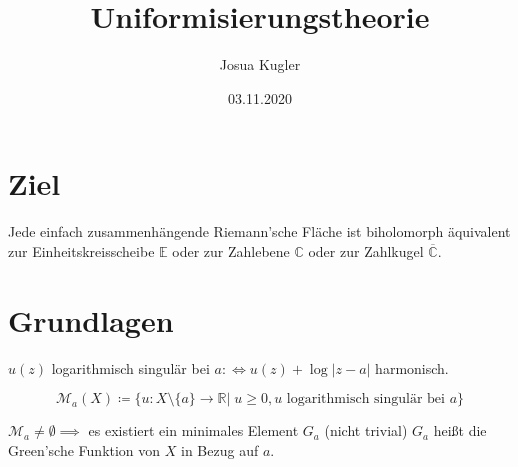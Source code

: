 \documentclass{beamer}
\title{Uniformisierungstheorie}
\author{Josua Kugler}
\date{03.11.2020}
\newcommand{\R}{\mathbb{R}}
\newcommand{\C}{\mathbb{C}}
\newcommand{\E}{\mathbb{E}}
\begin{document}
\titlepage
\section{Ziel}
    \begin{frame}
        \begin{theorem}[Uniformisierungssatz]
            Jede einfach zusammenhängende Riemann'sche Fläche ist biholomorph äquivalent zur Einheitskreisscheibe $\E$ oder zur Zahlebene $\C$ oder zur Zahlkugel $\overline{\C}$.
        \end{theorem}
    \end{frame}
    \section{Grundlagen}
    \begin{frame}
        \begin{definition}
            $u(z)$ logarithmisch singulär bei $a \colon\!\!\!\!\Leftrightarrow u(z) + \log |z-a|$ harmonisch. %
        \end{definition}
        \begin{definition}
            \[\mathcal{M}_a(X) \coloneqq \{u \colon X \setminus \{a\} \to \R|\; u \geq 0, u \text{ logarithmisch singulär bei } a\}\]
        \end{definition}
        \begin{definition}
            $\mathcal{M}_a \neq \emptyset \implies$ es existiert ein minimales Element $G_a$ (nicht trivial)
            $G_a$ heißt die Green'sche Funktion von $X$ in Bezug auf $a$.
        \end{definition}
    \end{frame}
    
    
    
\end{document}
